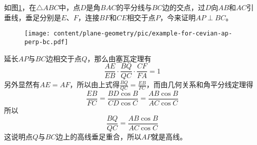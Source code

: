 \begin{example}
  如图\ref{fig:example-for-cevian-ap-perp-bc}，在$\triangle ABC$中，点$D$是角$BAC$的平分线与$BC$边的交点，过$D$向$AB$和$AC$引垂线，垂足分别是$E$、$F$，连接$BF$和$CE$相交于点$P$，今来证明$AP \perp BC$。

\begin{figure}[htbp]
\centering
\texttt{[image: content/plane-geometry/pic/example-for-cevian-ap-perp-bc.pdf]}
\caption{}
\label{fig:example-for-cevian-ap-perp-bc}
\end{figure}

延长$AP$与$BC$边相交于点$Q$，那么由塞瓦定理有
\begin{equation*}
  \frac{AE}{EB} \cdot \frac{BQ}{QC} \cdot \frac{CF}{FA} = 1
\end{equation*}
另外显然有$AE=AF$，所以由上式得$\frac{BQ}{QC}=\frac{EB}{FC}$，而由几何关系和角平分线定理得
\begin{equation*}
  \frac{EB}{FC} = \frac{BD \cos{B}}{CD \cos{C}} = \frac{AB \cos{B}}{AC \cos{C}}
\end{equation*}
所以
\begin{equation*}
  \frac{BQ}{QC} = \frac{AB \cos{B}}{AC \cos{C}}
\end{equation*}
这说明点$Q$与$BC$边上的高线垂足重合，所以$AP$就是高线。
\end{example}

